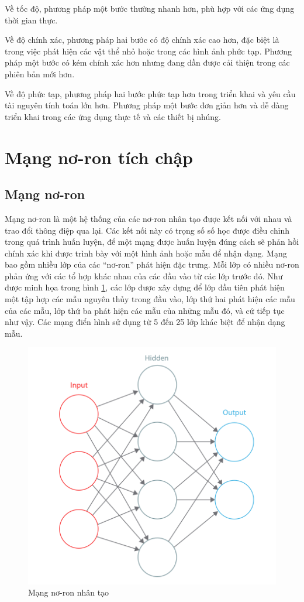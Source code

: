 Về tốc độ, phương pháp một bước thường nhanh hơn, phù hợp với các ứng dụng thời gian thực.

Về độ chính xác, phương pháp hai bước có độ chính xác cao hơn, đặc biệt là trong việc phát hiện các vật thể nhỏ hoặc trong các hình ảnh phức tạp. Phương pháp một bước có kém chính xác hơn nhưng đang dần được cải thiện trong các phiên bản mới hơn.

Về độ phức tạp, phương pháp hai bước phức tạp hơn trong triển khai và yêu cầu tài nguyên tính toán lớn hơn. Phương pháp một bước đơn giản hơn và dễ dàng triển khai trong các ứng dụng thực tế và các thiết bị nhúng.


\section{Mạng nơ-ron tích chập}

\subsection{Mạng nơ-ron}

Mạng nơ-ron là một hệ thống của các nơ-ron nhân tạo được kết nối với nhau và trao đổi thông điệp qua lại. Các kết nối này có trọng số số học được điều chỉnh trong quá trình huấn luyện, để một mạng được huấn luyện đúng cách sẽ phản hồi chính xác khi được trình bày với một hình ảnh hoặc mẫu để nhận dạng. Mạng bao gồm nhiều lớp của các “nơ-ron” phát hiện đặc trưng. Mỗi lớp có nhiều nơ-ron phản ứng với các tổ hợp khác nhau của các đầu vào từ các lớp trước đó. Như được minh họa trong hình \ref{fig:ann-intro}, các lớp được xây dựng để lớp đầu tiên phát hiện một tập hợp các mẫu nguyên thủy trong đầu vào, lớp thứ hai phát hiện các mẫu của các mẫu, lớp thứ ba phát hiện các mẫu của những mẫu đó, và cứ tiếp tục như vậy. Các mạng điển hình sử dụng từ 5 đến 25 lớp khác biệt để nhận dạng mẫu.
\begin{figure}[h]
	\centering
	\includegraphics[width=0.6\linewidth]{images/ann-intro}
	\caption{Mạng nơ-ron nhân tạo\cite{hijazi2015UsingCN}}
	\label{fig:ann-intro}
\end{figure}

